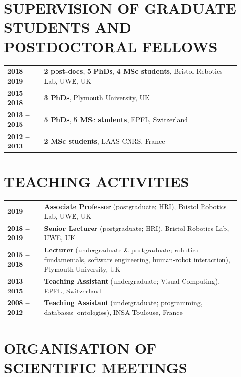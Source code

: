 \documentclass[11pt,a4paper]{report}
\begin{document}
\section{SUPERVISION OF GRADUATE STUDENTS AND POSTDOCTORAL FELLOWS}

\begin{tabular}{p{0.15\linewidth}p{0.8\linewidth}}
    \bf 2018 -- 2019 & \textbf{2 post-docs}, \textbf{5 PhDs}, \textbf{4 MSc students}, Bristol Robotics Lab, UWE, UK \\
    \bf 2015 -- 2018 & \textbf{3 PhDs}, Plymouth University, UK \\
    \bf 2013 -- 2015 & \textbf{5 PhDs}, \textbf{5 MSc students}, EPFL, Switzerland \\
    \bf 2012 -- 2013 & \textbf{2 MSc students}, LAAS-CNRS, France \\
\end{tabular}


\section{TEACHING ACTIVITIES}

\begin{tabular}{p{0.15\linewidth}p{0.8\linewidth}}
    \bf 2019 --  & \textbf{Associate Professor} (postgraduate; HRI), Bristol Robotics Lab, UWE, UK \\
    \bf 2018 -- 2019 & \textbf{Senior Lecturer} (postgraduate; HRI), Bristol Robotics Lab, UWE, UK \\
    \bf 2015 -- 2018 & \textbf{Lecturer} (undergraduate \& postgraduate; robotics
    fundamentals, software engineering, human-robot interaction), Plymouth University, UK \\
    \bf 2013 -- 2015 & \textbf{Teaching Assistant} (undergraduate; Visual Computing), EPFL, Switzerland \\
    \bf 2008 -- 2012 & \textbf{Teaching Assistant} (undergraduate; programming, databases, ontologies), INSA Toulouse, France \\
\end{tabular}

\section{ORGANISATION OF SCIENTIFIC MEETINGS}
\end{document}
